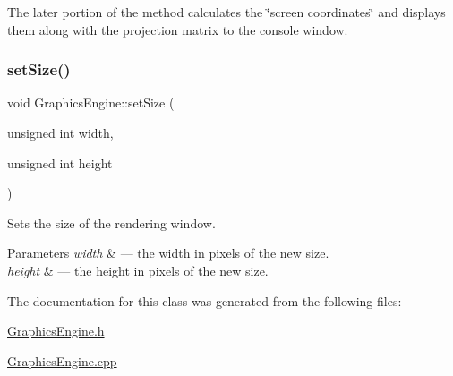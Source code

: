 The later portion of the method calculates the \char`\"{}screen coordinates\char`\"{} and displays them along with the projection matrix to the console window. \mbox{\label{class_graphics_engine_aac1a9cc3d195ed1f28018dffd80dae41}} 
\subsubsection{\texorpdfstring{set\+Size()}{setSize()}}
{\footnotesize\ttfamily void Graphics\+Engine\+::set\+Size (\begin{DoxyParamCaption}\item[{unsigned int}]{width,  }\item[{unsigned int}]{height }\end{DoxyParamCaption})}



Sets the size of the rendering window. 


\begin{DoxyParams}{Parameters}
{\em width} & --- the width in pixels of the new size.\\
\hline
{\em height} & --- the height in pixels of the new size. \\
\hline
\end{DoxyParams}


The documentation for this class was generated from the following files\+:\begin{DoxyCompactItemize}
\item 
\hyperlink{_graphics_engine_8h}{Graphics\+Engine.\+h}\item 
\hyperlink{_graphics_engine_8cpp}{Graphics\+Engine.\+cpp}\end{DoxyCompactItemize}
